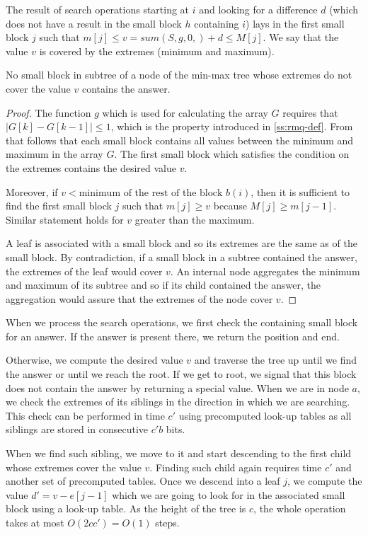 \begin{lemma}\label{l:search}
	The result of search operations starting at $i$ and looking for a difference $d$ (which does not have a result in the small block $h$ containing $i$) lays in the first small block $j$ such that $m[j] \le v = sum(S, g, 0, ) + d \le M[j]$.
	We say that the value $v$ is covered by the extremes (minimum and maximum).
	
	No small block in subtree of a node of the min-max tree whose extremes do not cover the value $v$ contains the answer.
\end{lemma}
\begin{proof}
	The function $g$ which is used for calculating the array $G$ requires that $| G[k] - G[k-1] | \le 1$, which is the property introduced in \ref{ss:rmq-def}.
	From that follows that each small block contains all values between the minimum and maximum in the array $G$.
	The first small block which satisfies the condition on the extremes contains the desired value $v$.
	
	Moreover, if $v < \textrm{minimum of the rest of the block } b(i)$, then it is sufficient to find the first small block $j$ such that $m[j] \ge v$ because $M[j] \ge m[j-1]$.
	Similar statement holds for $v$ greater than the maximum.
	
	A leaf is associated with a small block and so its extremes are the same as of the small block.
	By contradiction, if a small block in a subtree contained the answer, the extremes of the leaf would cover $v$.
	An internal node aggregates the minimum and maximum of its subtree and so if its child contained the answer, the aggregation would assure that the extremes of the node cover $v$.
\end{proof}

When we process the search operations, we first check the containing small block for an answer.
If the answer is present there, we return the position and end.

Otherwise, we compute the desired value $v$ and traverse the tree up until we find the answer or until we reach the root.
If we get to root, we signal that this block does not contain the answer by returning a special value.
When we are in node $a$, we check the extremes of its siblings in the direction in which we are searching.
This check can be performed in time $c'$ using precomputed look-up tables as all siblings are stored in consecutive $c' b$ bits.

When we find such sibling, we move to it and start descending to the first child whose extremes cover the value $v$.
Finding such child again requires time $c'$ and another set of precomputed tables.
Once we descend into a leaf $j$, we compute the value $d' = v - e[j - 1]$ which we are going to look for in the associated small block using a look-up table. 
As the height of the tree is $c$, the whole operation takes at most $O(2 c c') = O(1)$ steps.

